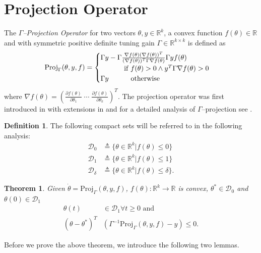 \documentclass[10pt,journal]{IEEEtran}
\theoremstyle{plain}%
\newtheorem{thm}{Theorem}%
\theoremstyle{definition}
\newtheorem{defn}{Definition}%
\newcommand{\be}[0]{\begin{equation}}
\newcommand{\ee}[0]{\end{equation}}
\renewcommand{\Re}[0]{\mathbb R}
\begin{document}
\section{Projection Operator}\label{ap:proj}
The {\em$\Gamma$--Projection Operator} for two vectors $\theta,y \in \mathbb R^k$, a convex function $f(\theta)\in \Re$ and with symmetric positive definite tuning gain $\Gamma \in \mathbb R^{k \times k}$ is defined as
\begin{equation}\label{eq:proj_vec_gamma}
\text{Proj}_\Gamma(\theta,y,f)=\begin{cases} \Gamma y- \Gamma\frac{\nabla f(\theta) (\nabla f(\theta))^T}{(\nabla f(\theta))^T \Gamma \nabla f(\theta)} \Gamma yf(\theta) \\ \quad \quad \quad \text{ if } f(\theta)>0 \wedge y^T\Gamma \nabla f(\theta)>0\\
\Gamma y  \hspace{8 pt}\quad \quad \text{ otherwise}\end{cases}
\end{equation}
where $\nabla f(\theta)=\left(\frac{\partial f(\theta)}{\partial \theta_1 }\; \cdots \; \frac{\partial f(\theta)}{\partial \theta_k } \right)^T $.  The projection operator was first introduced in \cite{pom92} with extensions in \cite{ioabook} and for a detailed analysis of $\Gamma$--projection see \cite{lav_arXiv}.

\begin{defn}The following compact sets will be referred to in the following analysis:
\be\label{def:d}\begin{split}
\mathcal D_0&\triangleq\{\theta\in\mathbb R^k | f(\theta)\leq 0\}\\
\mathcal D_1&\triangleq\{\theta\in\mathbb R^k | f(\theta)\leq 1\}\\
\mathcal D_\delta&\triangleq\{\theta\in\mathbb R^k | f(\theta)\leq \delta\}.
\end{split}
\ee
\end{defn}


\begin{thm} \label{thm:proj}Given ${\dot \theta= \text{Proj}_\Gamma(\theta,y,f)}$, $f(\theta):\mathbb R^k \rightarrow \mathbb R$ is convex, ${\theta^*\in{\mathcal D}_0}$ and ${\theta(0)\in{\mathcal D}_1}$   
\begin{align}\label{apptheta} \theta(t)&\in{\mathcal D}_1 \forall t\geq 0 \text{ and} \\
\label{eq:prop0vg}
(\theta-\theta^*)^T&(\Gamma^{-1}\text{Proj}_\Gamma({\theta},{y},{f})-y)\leq 0.
\end{align}
\end{thm}
Before we prove the above theorem, we introduce the following two lemmas.
\end{document}
